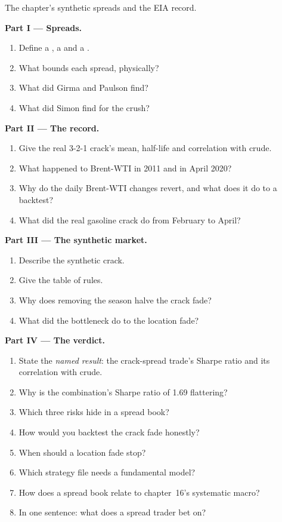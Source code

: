 \begin{problem}\label{pb:s2:commodity-spreads:1}
The chapter's synthetic spreads and the EIA record.

\medskip\noindent\textbf{Part I --- Spreads.}
\begin{enumerate}
\item Define a , a  and a .
\item What bounds each spread, physically?
\item What did Girma and Paulson find?
\item What did Simon find for the crush?
\end{enumerate}

\medskip\noindent\textbf{Part II --- The record.}
\begin{enumerate}[resume]
\item Give the real 3-2-1 crack's mean, half-life and correlation with crude.
\item What happened to Brent-WTI in 2011 and in April 2020?
\item Why do the daily Brent-WTI changes revert, and what does it do to a backtest?
\item What did the real gasoline crack do from February to April?
\end{enumerate}

\medskip\noindent\textbf{Part III --- The synthetic market.}
\begin{enumerate}[resume]
\item Describe the synthetic crack.
\item Give the table of rules.
\item Why does removing the season halve the crack fade?
\item What did the bottleneck do to the location fade?
\end{enumerate}

\medskip\noindent\textbf{Part IV --- The verdict.}
\begin{enumerate}[resume]
\item State the \emph{named result}: the crack-spread trade's Sharpe ratio and its correlation with crude.
\item Why is the combination's Sharpe ratio of 1.69 flattering?
\item Which three risks hide in a spread book?
\item How would you backtest the crack fade honestly?
\item When should a location fade stop?
\item Which strategy file needs a fundamental model?
\item How does a spread book relate to chapter~16's systematic macro?
\item In one sentence: what does a spread trader bet on?
\end{enumerate}
\end{problem}

